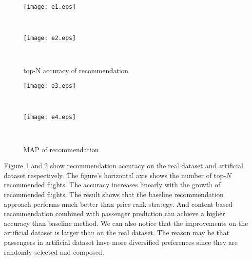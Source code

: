 \documentclass{llncs}
\begin{document}
\begin{figure}[!h]
              \begin{minipage}[t]{0.47\linewidth}
              \centering
              \texttt{[image: e1.eps]}\\
              \end{minipage}
              \begin{minipage}[t]{0.005\linewidth}~~~
              \end{minipage}
              \begin{minipage}[t]{0.47\linewidth}
              \centering
              \texttt{[image: e2.eps]}\\
              \end{minipage}
              \begin{minipage}[t]{0.005\linewidth}~~~
              \end{minipage}
              \caption{top-N accuracy of recommendation}
          \label{fig:top}
\end{figure}
\begin{figure}[!h]
              \begin{minipage}[t]{0.47\linewidth}
              \centering
              \texttt{[image: e3.eps]}\\
              \end{minipage}
              \begin{minipage}[t]{0.005\linewidth}~~~
              \end{minipage}
              \begin{minipage}[t]{0.47\linewidth}
              \centering
              \texttt{[image: e4.eps]}\\
              \end{minipage}
              \begin{minipage}[t]{0.005\linewidth}~~~
              \end{minipage}
              \caption{MAP of recommendation}
          \label{fig:rank}
\end{figure}\par
Figure \ref{fig:top} and \ref{fig:rank} show recommendation accuracy on the real dataset and artificial dataset respectively. The figure's horizontal axis shows the number of top-$N$ recommended flights. The accuracy increases linearly with the growth of recommended flights. The result shows that the baseline recommendation approach performs much better than price rank strategy. And content based recommendation combined with passenger prediction can achieve a higher accuracy than baseline method. We can also notice that the improvements on the artificial dataset is larger than on the real dataset. The reason may be that passengers in artificial dataset have more diversified preferences since they are randomly selected and composed.
\end{document}
